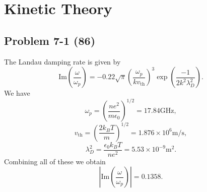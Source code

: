 \chapter{Kinetic Theory}
\label{ch:Seven}

\section*{Problem 7-1 (86)}
\label{sec:7-1}
The Landau damping rate is given by
\begin{equation*}
	\text{Im}(\dfrac{\omega}{\omega_p}) = -0.22\sqrt{\pi}\left(\dfrac{\omega_p}{kv_\text{th}} \right)^3\exp\left(\dfrac{-1}{2k^2\lambda_D^2}\right).
\end{equation*}
We have
\begin{equation*}
	\omega_p = \left(\dfrac{ne^2}{m\epsilon_0}\right)^{1/2} = 17.84 \text{GHz},
\end{equation*}
\begin{equation*}
	v_\text{th} = \left(\dfrac{2k_BT}{m}\right)^{1/2} = 1.876\times 10^6 \text{m/s},
\end{equation*}
\begin{equation*}
	\lambda_D^2 = \dfrac{\epsilon_0k_BT}{ne^2} = 5.53 \times 10^{-9}\text{m}^{2}.
\end{equation*}
Combining all of these we obtain
\begin{equation*}
	\left|\text{Im}\left(\dfrac{\omega}{\omega_p}\right)\right| = 0.1358.
\end{equation*}

